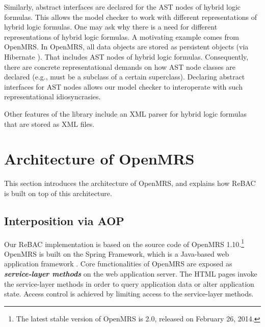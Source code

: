 \documentclass{acm_proc_article-sp}
\newcommand{\Dfn}[1]{\textbf{\emph{#1}}}
\begin{document}
Similarly, abstract interfaces are declared for the AST nodes of
hybrid logic formulas.  This allows the model checker to work with
different representations of hybrid logic formulas.  One may ask why
there is a need for different representations of hybrid logic
formulas.  A motivating example comes from OpenMRS.  In OpenMRS, all
data objects are stored as persistent objects (via Hibernate
\cite{Hibernate}).  That includes AST nodes of hybrid logic formulas.
Consequently, there are concrete representational demands on how AST
node classes are declared (e.g., must be a subclass of a certain
superclass).  Declaring abstract interfaces for AST nodes allows our
model checker to interoperate with such representational
idiosyncrasies.

Other features of the library include an XML parser for hybrid logic
formulas that are stored as XML files.


\section{Architecture of O\MakeLowercase{pen}MRS}
\label{sec-architecture}

This section introduces the architecture of OpenMRS, and explains
how ReBAC is built on top of this architecture.


\subsection{Interposition via AOP}

Our ReBAC implementation is based on the source code of OpenMRS
1.10.\footnote{The latest stable version of OpenMRS is 2.0, released
  on February 26, 2014.}  OpenMRS is built on the Spring Framework,
which is a Java-based web application framework \cite{Spring}.  Core
functionalities of OpenMRS are exposed as \Dfn{service-layer methods}
on the web application server.  The HTML pages invoke the
service-layer methods in order to query application data or alter
application state.  Access control is achieved by limiting access to
the service-layer methods.
\end{document}
